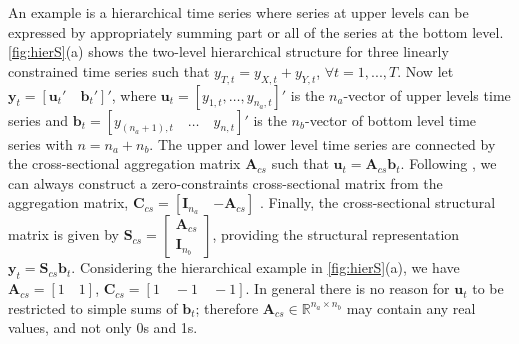 \documentclass[a4paper,11pt]{article}
\newcommand{\bvet}{\bm{b}}
\newcommand{\uvet}{\bm{u}}
\newcommand{\yvet}{\bm{y}}
\newcommand{\Avet}{\bm{A}}
\newcommand{\Cvet}{\bm{C}}
\newcommand{\Ivet}{\bm{I}}
\newcommand{\Svet}{\bm{S}}
\theoremstyle{definition}
\begin{document}
An example is a hierarchical time series where series at upper levels can be expressed by appropriately summing part or all of the series at the bottom level. \autoref{fig:hierS}(a) shows the two-level hierarchical structure for three linearly constrained time series such that $y_{T,t} = y_{X,t} + y_{Y,t}$, $\forall t = 1,...,T$. Now let $\yvet_t = \left[\uvet_t' \quad \bvet_t'\right]'$, where $\uvet_t = [y_{1,t}, \dots, y_{n_a,t}]'$ is the $n_a$-vector of upper levels time series and $\bvet_t = \left[y_{(n_a+1),t}\quad \dots \quad y_{n,t}\right]'$ is the $n_b$-vector of bottom level time series with $n = n_a+n_b$. The upper and lower level time series are connected by the cross-sectional aggregation matrix $\Avet_{cs}$ such that $\uvet_t = \Avet_{cs}\bvet_t$. Following \cite{giro2022}, we can always construct a zero-constraints cross-sectional matrix from the aggregation matrix, $\Cvet_{cs}=\left[\Ivet_{n_a} \quad {-\Avet_{cs}}\right]$ . Finally, the cross-sectional structural matrix is given by $\Svet_{cs} = \left[\begin{array}{c}
	\Avet_{cs}\\
	\Ivet_{n_b}
\end{array}\right]$, providing the structural representation \citep{hyndman2011} $\yvet_t = \Svet_{cs} \bvet_t$. Considering the hierarchical example in \autoref{fig:hierS}(a), we have $\Avet_{cs} = \left[ 1 \quad 1 \right]$, $\Cvet_{cs} = \left[ 1 \quad -1\quad -1 \right]$. In general there is no reason for $\uvet_t$ to be restricted to simple sums of $\bvet_t$; therefore $\Avet_{cs} \in \mathbb{R}^{n_a\times n_b}$ may contain any real values, and not only 0s and 1s.
\end{document}
